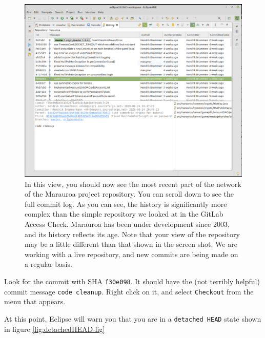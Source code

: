 \documentclass[
]{book}
\begin{document}
\begin{figure}

{\centering \includegraphics[width=1\linewidth]{images/1.4historyTab} 

}

\caption{In this view, you should now see the most recent part of the network of the Marauroa project repository. You can scroll down to see the full commit log. As you can see, the history is significantly more complex than the simple repository we looked at in the GitLab Access Check. Marauroa has been under development since 2003, and its history reflects its age.  Note that your view of the repository may be a little different than that shown in the screen shot.  We are working with a live repository, and new commits are being made on a regular basis.}\label{fig:historyTab-fig}
\end{figure}

Look for the commit with SHA \texttt{f30e098}. It should have the (not terribly helpful) commit message \texttt{code\ cleanup}. Right click on it, and select \texttt{Checkout} from the menu that appears.

At this point, Eclipse will warn you that you are in a \texttt{detached\ HEAD} state shown in figure \ref{fig:detachedHEAD-fig}
\end{document}
